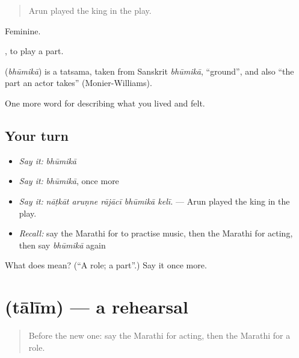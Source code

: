 \begin{quote}
Arun played the king in the play.
\end{quote}

Feminine.

 , to play a part.

\begin{cousinweb}
\textbf{} (\emph{bhūmikā}) is a tatsama, taken from Sanskrit \emph{bhūmikā}, \textquotedblleft{}ground\textquotedblright{}, and also \textquotedblleft{}the part an actor takes\textquotedblright{} (Monier-Williams).
\end{cousinweb}

\begin{grammarlens}[title={What you've built}]
One more word for describing what you lived and felt.
\end{grammarlens}

\subsection*{Your turn}
\begin{itemize}
\raggedright
  \item \emph{Say it:} \emph{bhūmikā}
  \item \emph{Say it:} \emph{bhūmikā}, once more
  \item \emph{Say it:} \emph{nāṭkāt aruṇne rājācī bhūmikā kelī.} — Arun played the king in the play.
  \item \emph{Recall:} say the Marathi for to practise music, then the Marathi for acting, then say \emph{bhūmikā} again
\end{itemize}

\begin{tcolorbox}[breakable,colback=teal!4,colframe=teal!35!black,title={Before you move on}]
What does  mean? (\textquotedblleft{}A role; a part\textquotedblright{}.) Say it once more.
\end{tcolorbox}
\section[\texorpdfstring{\mr{तालीम} (tālīm)}{तालीम (tālīm)}]{ (tālīm) — a rehearsal}

\label{lesson:MR-C537-talim}



\begin{quote}
Before the new one: say the Marathi for acting, then the Marathi for a role.
\end{quote}

